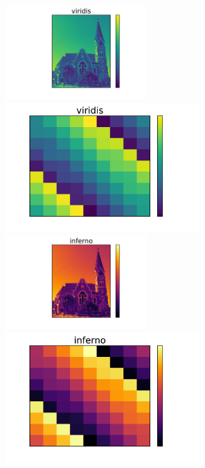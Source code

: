 \documentclass{beamer}
\begin{document}
\begin{frame}
\begin{columns}
\begin{column}{0.5\textwidth}
\end{column}
\begin{column}{0.5\textwidth}
\begin{center}
\vfill
\includegraphics[width=0.42\textwidth]{church_viridis.pdf}
\includegraphics[width=0.58\textwidth]{magicsquare_viridis.pdf}\newline\newline
\vfill
\includegraphics[width=0.42\textwidth]{church_inferno.pdf}
\includegraphics[width=0.58\textwidth]{magicsquare_inferno.pdf}
\vfill
\end{center}
\end{column}
\end{columns}
\end{frame}
\end{document}
